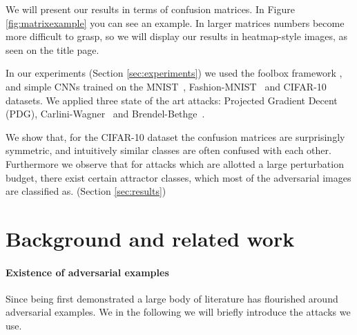 \documentclass{article}
\begin{document}
We will present our results in terms of confusion matrices. In Figure \ref{fig:matrixexample} you can see an example. In larger matrices numbers become more difficult to grasp, so we will display our results in heatmap-style images, as seen on the title page.

In our experiments (Section \ref{sec:experiments}) we used the foolbox framework \cite{rauber2017foolbox}, and simple CNNs trained on the MNIST~\cite{deng2012mnist}, Fashion-MNIST~\cite{deng2012mnist} and CIFAR-10~\cite{krizhevsky2009learning} datasets. We applied three state of the art attacks: Projected Gradient Decent (PDG)\cite{madry2017towards}, Carlini-Wagner~\cite{carlini2017towards} and Brendel-Bethge~\cite{brendel2019accurate}.

We show that, for the CIFAR-10 dataset the confusion matrices are surprisingly symmetric, and intuitively similar classes are often confused with each other. Furthermore we observe that for attacks which are allotted a large perturbation budget, there exist certain attractor classes, which most of the adversarial images are classified as. (Section \ref{sec:results})

%



\section{Background and related work}

\paragraph{Existence of adversarial examples}
Since being first demonstrated \cite{Szegedy13} a large body of literature has flourished around adversarial examples. We in the following we will briefly introduce the attacks we use.
\end{document}
